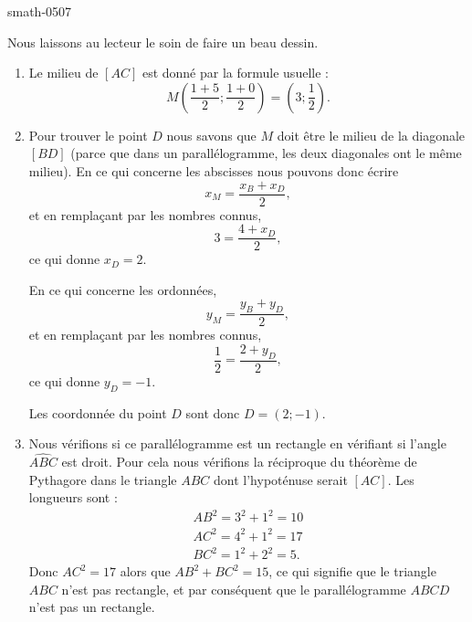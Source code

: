 
\begin{corrige}{smath-0507}

    Nous laissons au lecteur le soin de faire un beau dessin.
    \begin{enumerate}
        \item
            Le milieu de \( [AC]\) est donné par la formule usuelle :
            \begin{equation}
                M\left( \frac{ 1+5 }{2};\frac{ 1+0 }{2} \right)=(3;\frac{ 1 }{2}).
            \end{equation}
        \item
            Pour trouver le point \( D\) nous savons que \( M\) doit être le milieu de la diagonale \( [BD]\) (parce que dans un parallélogramme, les deux diagonales ont le même milieu). En ce qui concerne les abscisses nous pouvons donc écrire
            \begin{equation}
                x_M=\frac{ x_B+x_D }{2},
            \end{equation}
            et en remplaçant par les nombres connus,
            \begin{equation}
                3=\frac{ 4+x_D }{2},
            \end{equation}
            ce qui donne \( x_D=2\).

            En ce qui concerne les ordonnées,
            \begin{equation}
                y_M=\frac{ y_B+y_D }{2},
            \end{equation}
            et en remplaçant par les nombres connus,
            \begin{equation}
                \frac{ 1 }{2}=\frac{ 2+y_D }{2},
            \end{equation}
            ce qui donne \( y_D=-1\).

            Les coordonnée du point \( D\) sont donc \( D=(2;-1)\).

        \item
            Nous vérifions si ce parallélogramme est un rectangle en vérifiant si l'angle \( \widehat{ABC}\) est droit. Pour cela nous vérifions la réciproque du théorème de Pythagore dans le triangle \( ABC\) dont l'hypoténuse serait \( [AC]\). Les longueurs sont :
            \begin{subequations}
                \begin{align}
                    AB^2=3^2+1^2=10\\
                    AC^2=4^2+1^2=17\\
                    BC^2=1^2+2^2=5.
                \end{align}
            \end{subequations}
            Donc \( AC^2=17\) alors que \( AB^2+BC^2=15\), ce qui signifie que le triangle \( ABC\) n'est pas rectangle, et par conséquent que le parallélogramme \( ABCD\) n'est pas un rectangle.

    \end{enumerate}

\end{corrige}
